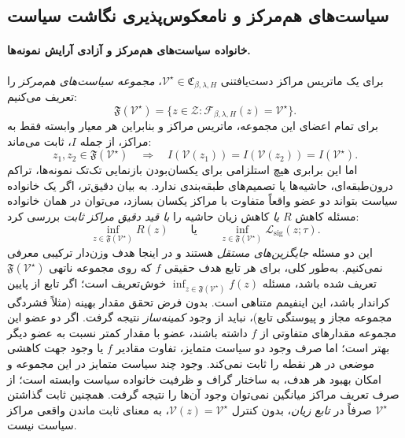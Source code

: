 \subsection{سیاست‌های هم‌مرکز و نامعکوس‌پذیری نگاشت سیاست}

\paragraph{خانواده سیاست‌های هم‌مرکز و آزادی آرایش نمونه‌ها.}
برای یک ماتریس مراکز دست‌یافتنی
$\mathcal V^\star\in\mathfrak C_{\beta,\lambda,H}$،
\emph{مجموعه سیاست‌های هم‌مرکز} را تعریف می‌کنیم:
\begin{equation}\label{cmp:eq:ch3-fixed-center-fiber}
\boxed{
\mathfrak F(\mathcal V^\star)
=\{z\in\mathcal Z:
\mathcal F_{\beta,\lambda,H}(z)=\mathcal V^\star\}.
}
\end{equation}
برای تمام اعضای این مجموعه،
ماتریس مراکز و بنابراین هر معیار
وابسته فقط به مراکز، از جمله $I$،
ثابت می‌ماند:
\begin{equation}\label{cmp:eq:ch3-fixed-center-I}
\boxed{
z_1,z_2\in\mathfrak F(\mathcal V^\star)
\quad\Longrightarrow\quad
I(\mathcal V(z_1))=I(\mathcal V(z_2))
=I(\mathcal V^\star).
}
\end{equation}
اما این برابری هیچ استلزامی برای
یکسان‌بودن بازنمایی تک‌تک نمونه‌ها،
تراکم درون‌طبقه‌ای، حاشیه‌ها
یا تصمیم‌های طبقه‌بندی ندارد.
به بیان دقیق‌تر، اگر یک خانواده سیاست
بتواند دو عضو واقعاً متفاوت
با مراکز یکسان بسازد،
می‌توان در همان خانواده
مسئله کاهش $R$ \emph{یا}
کاهش زیان حاشیه را
\emph{با قید دقیق مراکز ثابت}
بررسی کرد:
\begin{equation}\label{cmp:eq:ch3-fixed-center-objectives}
\boxed{
\inf_{z\in\mathfrak F(\mathcal V^\star)}R(z)
\qquad\text{یا}\qquad
\inf_{z\in\mathfrak F(\mathcal V^\star)}
\mathcal L_{\mathrm{sig}}(z;\tau).
}
\end{equation}
این دو مسئله \emph{جایگزین‌های مستقل}
هستند و در اینجا هدف وزن‌دار
ترکیبی معرفی نمی‌کنیم.
به‌طور کلی، برای هر تابع هدف حقیقی
$f$ که روی مجموعه ناتهی
$\mathfrak F(\mathcal V^\star)$ تعریف شده باشد،
مسئله $\inf_{z\in\mathfrak F(\mathcal V^\star)}f(z)$
خوش‌تعریف است؛ اگر تابع از پایین کراندار باشد،
این اینفیمم متناهی است. بدون فرض تحقق مقدار بهینه
(مثلاً فشردگی مجموعه مجاز و پیوستگی تابع)،
نباید از وجود \emph{کمینه‌ساز} نتیجه گرفت.
اگر دو عضو این مجموعه مقدارهای متفاوتی از $f$
داشته باشند، عضو با مقدار کمتر نسبت به عضو دیگر
بهتر است؛ اما صرف وجود دو سیاست متمایز،
تفاوت مقادیر $f$ یا وجود جهت کاهشی موضعی
در هر نقطه را ثابت نمی‌کند.
وجود چند سیاست متمایز در این
مجموعه و امکان بهبود هر هدف،
به ساختار گراف و ظرفیت
خانواده سیاست وابسته است؛
از صرف تعریف مراکز میانگین
نمی‌توان وجود آن‌ها را نتیجه گرفت.
همچنین ثابت گذاشتن
$\mathcal V^\star$ صرفاً در
\emph{تابع زیان}، بدون کنترل
$\mathcal V(z)=\mathcal V^\star$،
به معنای ثابت ماندن واقعی
مراکز سیاست نیست.



